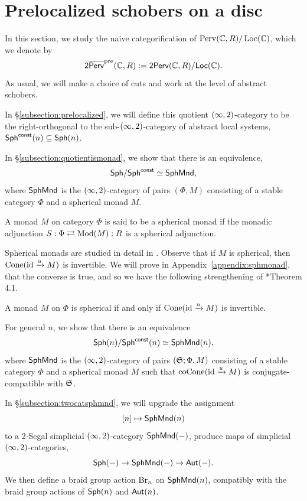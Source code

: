 \section{Prelocalized schobers on a disc}\label{section:prelocalized}
In this section, we study the naive categorification of $\operatorname{Perv}(\mathbb{C},R)/\operatorname{Loc}(\mathbb{C})$, which we denote by
\[\mathsf{2}\overline{\mathsf{Perv}}^{\operatorname{pre}}(\mathbb{C},R) := \mathsf{2Perv}(\mathbb{C},R)/\mathsf{Loc}(\mathbb{C}).\]
As usual, we will make a choice of cuts and work at the level of abstract schobers.

In \S\ref{subsection:prelocalized}, we will define this quotient $(\infty,2)$-category to be the right-orthogonal to the sub-$(\infty,2)$-category of abstract local systems, $\mathsf{Sph}^{\mathsf{const}}(n)\subseteq \mathsf{Sph}(n)$.

In \S\ref{subsection:quotientismonad}, we show that there is an equivalence,
\[\mathsf{Sph}/\mathsf{Sph}^{\mathsf{const}}\simeq \mathsf{SphMnd},\]
where $\mathsf{SphMnd}$ is the $(\infty,2)$-category of pairs $(\Phi,M)$ consisting of a stable category $\Phi$ and a spherical monad $M$.

\begin{defn}\label{defn:sphmonad}
    A monad $M$ on category $\Phi$ is said to be a spherical monad if the monadic adjunction $S:\Phi\rightleftarrows\operatorname{Mod}(M):R$ is a spherical adjunction.
\end{defn}

Spherical monads are studied in detail in \cite{christSphericalMonadicAdjunctions2023}. Observe that if $M$ is spherical, then $\operatorname{Cone}(\operatorname{id}\xrightarrow{u} M)$ is invertible. We will prove in Appendix~\ref{appendix:sphmonad}, that the converse is true, and so we have the following strengthening of \cite{christSphericalMonadicAdjunctions2023}*{Theorem 4.1}.

\begin{thm}\label{thm:christstrengthening1}
    A monad $M$ on $\Phi$ is spherical if and only if $\operatorname{Cone}(\operatorname{id}\xrightarrow{u} M)$ is invertible.
\end{thm}

For general $n$, we show that there is an equivalence
\[\mathsf{Sph}(n)/\mathsf{Sph}^{\mathsf{const}}(n)\simeq \mathsf{SphMnd}(n),\]
where $\mathsf{SphMnd}$ is the $(\infty,2)$-category of pairs $(\mathfrak{S};\Phi,M)$ consisting of a stable category $\Phi$ and a spherical monad $M$ such that $\operatorname{coCone}(\operatorname{id}\xrightarrow{u} M)$ is conjugate-compatible with $\mathfrak{S}$.

In \S\ref{subsection:twocatsphmnd}, we will upgrade the assignment
\[[n]\mapsto\mathsf{SphMnd}(n)\]
to a 2-Segal simplicial $(\infty,2)$-category $\mathsf{SphMnd}(-)$, produce maps of simplicial $(\infty,2)$-categories,
\[\mathsf{Sph}(-)\to \mathsf{SphMnd}(-)\to \mathsf{Aut}(-).\]
We then define a braid group action $\operatorname{Br}_n$ on $\mathsf{SphMnd}(n)$, compatibly with the braid group actions of $\mathsf{Sph}(n)$ and $\mathsf{Aut}(n)$.

